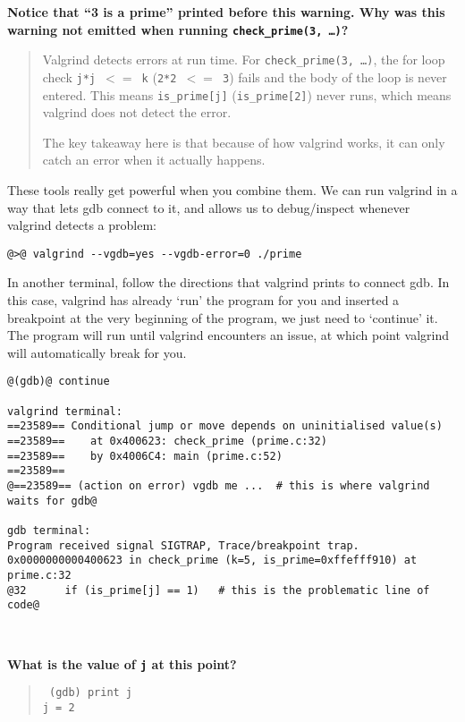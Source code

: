 \documentclass{article}
\begin{document}
\newpage
\textbf{Notice that ``3 is a prime'' printed before this warning. Why was this
  warning not emitted when running \texttt{check\_prime(3,~\dots)}?}
\begin{quote}
  \color{violet}
  Valgrind detects errors at run time. For \texttt{check\_prime(3,~\dots)},
  the for loop check \texttt{j*j~$<=$~k} (\texttt{2*2~$<=$~3}) fails and
  the body of the loop is never entered. This means \texttt{is\_prime[j]}
  (\texttt{is\_prime[2]}) never runs, which means valgrind does not detect
  the error.

  The key takeaway here is that because of how valgrind works, it can only
  catch an error when it actually happens.
\end{quote}

These tools really get powerful when you combine them. We can run valgrind in
a way that lets gdb connect to it, and allows us to debug/inspect whenever
valgrind detects a problem:
\begin{lstlisting}
@>@ valgrind --vgdb=yes --vgdb-error=0 ./prime
\end{lstlisting}
In another terminal, follow the directions that valgrind prints to connect
gdb. In this case, valgrind has already `run' the program for you and inserted
a breakpoint at the very beginning of the program, we just need to `continue'
it. The program will run until valgrind encounters an issue, at which point
valgrind will automatically break for you.
\begin{lstlisting}
@(gdb)@ continue

valgrind terminal:
==23589== Conditional jump or move depends on uninitialised value(s)
==23589==    at 0x400623: check_prime (prime.c:32)
==23589==    by 0x4006C4: main (prime.c:52)
==23589== 
@==23589== (action on error) vgdb me ...  # this is where valgrind waits for gdb@

gdb terminal:
Program received signal SIGTRAP, Trace/breakpoint trap.
0x0000000000400623 in check_prime (k=5, is_prime=0xffefff910) at prime.c:32
@32      if (is_prime[j] == 1)   # this is the problematic line of code@
\end{lstlisting}

~

\textbf{What is the value of \texttt{j} at this point?}\\
\begin{quote}
  \color{violet}\tt
  (gdb) print j\\
  j = 2
\end{quote}
\end{document}
